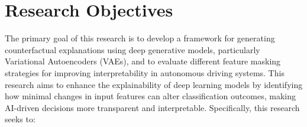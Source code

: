 



\section{Research Objectives}
The primary goal of this research is to develop a framework for generating counterfactual explanations using deep generative models, particularly Variational Autoencoders (VAEs), and to evaluate different feature masking strategies for improving interpretability in autonomous driving systems. This research aims to enhance the explainability of deep learning models by identifying how minimal changes in input features can alter classification outcomes, making AI-driven decisions more transparent and interpretable. Specifically, this research seeks to:

